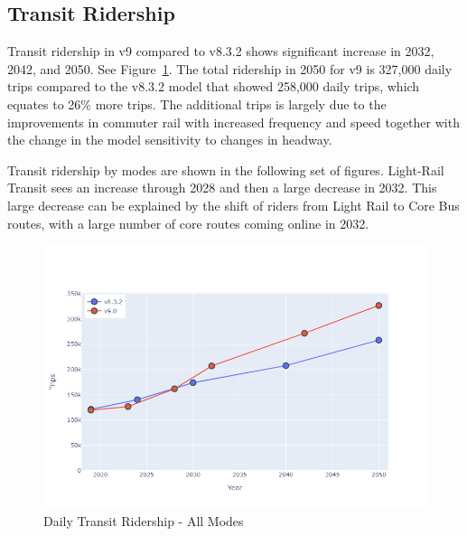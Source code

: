 \documentclass[
  letterpaper,
  DIV=11,
  numbers=noendperiod]{scrreprt}
\begin{document}
\hypertarget{transit-ridership}{%
\subsection{Transit Ridership}\label{transit-ridership}}

Transit ridership in v9 compared to v8.3.2 shows significant increase in
2032, 2042, and 2050. See Figure~\ref{fig-pdf-hy-tr-all}. The total
ridership in 2050 for v9 is 327,000 daily trips compared to the v8.3.2
model that showed 258,000 daily trips, which equates to 26\% more trips.
The additional trips is largely due to the improvements in commuter rail
with increased frequency and speed together with the change in the model
sensitivity to changes in headway.

Transit ridership by modes are shown in the following set of figures.
Light-Rail Transit sees an increase through 2028 and then a large
decrease in 2032. This large decrease can be explained by the shift of
riders from Light Rail to Core Bus routes, with a large number of core
routes coming online in 2032.

\begin{figure}[H]

{\centering \includegraphics{v9x/v900/whats-new/_pictures/pdf-hy-tr-all.png}

}

\caption{\label{fig-pdf-hy-tr-all}Daily Transit Ridership - All Modes}

\end{figure}
\end{document}
